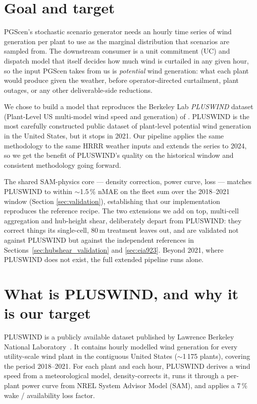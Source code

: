 \documentclass[11pt]{article}
\newcommand{\term}[1]{\emph{#1}}
\begin{document}
\section{Goal and target}
\label{sec:goal}

PGScen's stochastic scenario generator needs an hourly time series of
wind generation per plant to use as the marginal distribution that
scenarios are sampled from. The downstream consumer is a unit
commitment (UC) and dispatch model that itself decides how much wind
is curtailed in any given hour, so the input PGScen takes from us is
\emph{potential} wind generation: what each plant would produce given
the weather, before operator-directed curtailment, plant outages, or
any other deliverable-side reductions.

We chose to build a model that reproduces the Berkeley Lab
\term{PLUSWIND} dataset (Plant-Level US multi-model wind speed and
generation) of \citet{millstein2023pluswind}. PLUSWIND is the most
carefully constructed
public dataset of plant-level potential wind generation in the United
States, but it stops in 2021. Our pipeline applies the same methodology to
the same HRRR weather inputs and extends the series to 2024, so we get the
benefit of PLUSWIND's quality on the historical window and consistent
methodology going forward.

The shared SAM-physics core --- density correction, power curve, loss
--- matches PLUSWIND to within $\sim$1.5\,\% nMAE on the fleet sum over
the 2018--2021 window (Section \ref{sec:validation}), establishing that
our implementation reproduces the reference recipe. The two extensions
we add on top, multi-cell aggregation and hub-height shear, deliberately
depart from PLUSWIND: they correct things its single-cell, 80\,m
treatment leaves out, and are validated not against PLUSWIND but against
the independent references in Sections~\ref{sec:hubshear_validation} and
\ref{sec:eia923}. Beyond 2021, where PLUSWIND does not exist, the full
extended pipeline runs alone.

\section{What is PLUSWIND, and why it is our target}
\label{sec:pluswind}

PLUSWIND is a publicly available dataset published by Lawrence Berkeley
National Laboratory~\citep{millstein2023pluswind}. It contains hourly
modelled wind generation for every
utility-scale wind plant in the contiguous United States ($\sim$1\,175
plants), covering the period 2018--2021. For each plant and each hour,
PLUSWIND derives a wind speed from a meteorological model, density-corrects
it, runs it through a per-plant power curve from NREL System Advisor Model
(SAM), and applies a 7\,\% wake / availability loss factor.
\end{document}
